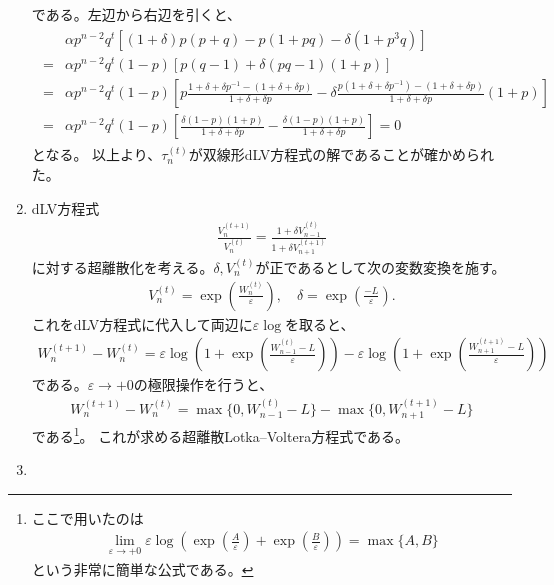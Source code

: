 \documentclass{jsarticle}
\begin{document}
\begin{enumerate}
\begin{align}
\end{align}
である。左辺から右辺を引くと、
\begin{align}
\begin{split}
&\alpha p^{n-2}q^{t}\left[(1+\delta)p(p+q)-p(1+pq)-\delta(1+p^{3}q)\right]\\
=&\alpha p^{n-2}q^{t}(1-p)\left[p(q-1)+\delta(pq-1)(1+p)\right]\\
=&\alpha p^{n-2}q^{t}(1-p)\left[p\frac{1+\delta+\delta p^{-1}-(1+\delta+\delta p)}{1+\delta+\delta p}-\delta\frac{p(1+\delta+\delta p^{-1})-(1+\delta+\delta p)}{1+\delta+\delta p}(1+p)\right]\\
=&\alpha p^{n-2}q^{t}(1-p)\left[\frac{\delta(1-p)(1+p)}{1+\delta+\delta p}-\frac{\delta(1-p)(1+p)}{1+\delta+\delta p}\right]=0
\end{split}
\end{align}
となる。
以上より、$\tau_{n}^{(t)}$が双線形dLV方程式の解であることが確かめられた。
\item 
dLV方程式
\begin{align}
\frac{V_{n}^{(t+1)}}{V_{n}^{(t)}}=\frac{1+\delta V_{n-1}^{(t)}}{1+\delta V_{n+1}^{(t+1)}}
\end{align}
に対する超離散化を考える。$\delta,V_{n}^{(t)}$が正であるとして次の変数変換を施す。
\begin{align}
V_{n}^{(t)}=\exp\left(\frac{W_{n}^{(t)}}{\varepsilon}\right),\quad
\delta=\exp\left(\frac{-L}{\varepsilon}\right).
\end{align}
これをdLV方程式に代入して両辺に$\varepsilon\log$を取ると、
\begin{align}
W_{n}^{(t+1)}-W_{n}^{(t)}=\varepsilon\log\left(1+\exp\left(\frac{W_{n-1}^{(t)}-L}{\varepsilon}\right)\right)
-\varepsilon\log\left(1+\exp\left(\frac{W_{n+1}^{(t+1)}-L}{\varepsilon}\right)\right)
\end{align}
である。$\varepsilon\to+0$の極限操作を行うと、
\begin{align}
W_{n}^{(t+1)}-W_{n}^{(t)}
=\max\{0,W_{n-1}^{(t)}-L\}-\max\{0,W_{n+1}^{(t+1)}-L\}
\end{align}
である\footnote{
ここで用いたのは
\begin{align*}
\lim_{\varepsilon\to+0}\varepsilon\log\left(\exp\left(\frac{A}{\varepsilon}\right)+\exp\left(\frac{B}{\varepsilon}\right)\right)
=\max\{A,B\}
\end{align*}
という非常に簡単な公式である。
}。
これが求める超離散Lotka--Voltera方程式である。
\item 

\end{enumerate}
\end{document}
